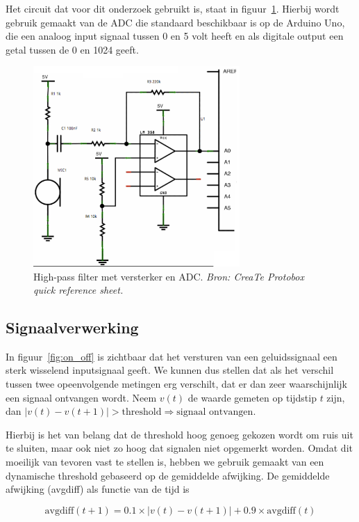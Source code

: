 \documentclass[a4paper,10pt]{article}
\begin{document}
Het circuit dat voor dit onderzoek gebruikt is, staat in figuur~\ref{fig:circuit}. Hierbij wordt gebruik gemaakt van de ADC die standaard beschikbaar is op de Arduino Uno, die een analoog input signaal tussen 0 en 5 volt heeft en als digitale output een getal tussen de 0 en 1024 geeft.

\begin{figure}[ht!]
    \centering
    \includegraphics[width=0.7\textwidth]{high_pass_filter_circuit.png}
    \caption{High-pass filter met versterker en ADC. \textit{Bron: CreaTe Protobox quick reference sheet.}}
    \label{fig:circuit}
\end{figure}
\FloatBarrier

\subsection{Signaalverwerking}
In figuur~\ref{fig:on_off} is zichtbaar dat het versturen van een geluidssignaal een sterk wisselend inputsignaal geeft. We kunnen dus stellen dat als het verschil tussen twee opeenvolgende metingen erg verschilt, dat er dan zeer waarschijnlijk een signaal ontvangen wordt. Neem $v(t)$ de waarde gemeten op tijdstip $t$ zijn, dan $|v(t) - v(t+1)| > \text{threshold} \Rightarrow \text{signaal ontvangen}$.

Hierbij is het van belang dat de threshold hoog genoeg gekozen wordt om ruis uit te sluiten, maar ook niet zo hoog dat signalen niet opgemerkt worden. Omdat dit moeilijk van tevoren vast te stellen is, hebben we gebruik gemaakt van een dynamische threshold gebaseerd op de gemiddelde afwijking. De gemiddelde afwijking (avgdiff) als functie van de tijd is

$$\text{avgdiff}(t+1) = 0.1\times |v(t) - v(t+1)| + 0.9\times\text{avgdiff}(t)$$
\end{document}
